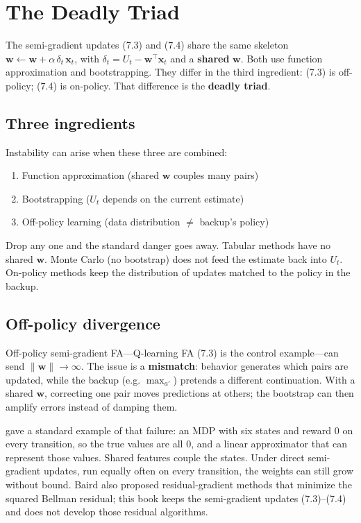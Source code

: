 


\section{The Deadly Triad}

The semi-gradient updates (7.3) and (7.4) share the same skeleton $\mathbf{w}\leftarrow\mathbf{w}+\alpha\,\delta_t\,\mathbf{x}_t$, with $\delta_t=U_t-\mathbf{w}^\top\mathbf{x}_t$ and a \textbf{shared} $\mathbf{w}$. Both use function approximation and bootstrapping. They differ in the third ingredient: (7.3) is off-policy; (7.4) is on-policy. That difference is the \textbf{deadly triad}.

\subsection{Three ingredients}

\begin{minipage}{\textwidth}
Instability can arise when these three are combined:
\begin{enumerate}
\item Function approximation (shared $\mathbf{w}$ couples many pairs)
\item Bootstrapping ($U_t$ depends on the current estimate)
\item Off-policy learning (data distribution $\neq$ backup's policy)
\end{enumerate}
\end{minipage}

Drop any one and the standard danger goes away. Tabular methods have no shared $\mathbf{w}$. Monte Carlo (no bootstrap) does not feed the estimate back into $U_t$. On-policy methods keep the distribution of updates matched to the policy in the backup.

\subsection{Off-policy divergence}

Off-policy semi-gradient FA---Q-learning FA (7.3) is the control example---can send $\|\mathbf{w}\|\to\infty$. The issue is a \textbf{mismatch}: behavior generates which pairs are updated, while the backup (e.g. $\max_{a'}$) pretends a different continuation. With a shared $\mathbf{w}$, correcting one pair moves predictions at others; the bootstrap can then amplify errors instead of damping them.

 gave a standard example of that failure: an MDP with six states and reward $0$ on every transition, so the true values are all $0$, and a linear approximator that can represent those values. Shared features couple the states. Under direct semi-gradient updates, run equally often on every transition, the weights can still grow without bound. Baird also proposed residual-gradient methods that minimize the squared Bellman residual; this book keeps the semi-gradient updates (7.3)--(7.4) and does not develop those residual algorithms.

